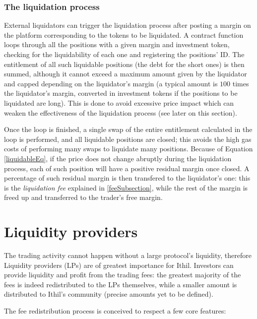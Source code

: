 \documentclass [10pt, fancyhdr, twoside] {article}
\begin{document}
\subsubsection{The liquidation process}\label{liquidationProcessSubsubsection}

External liquidators can trigger the liquidation process after posting a margin on the platform corresponding to the tokens to be liquidated. A contract function loops through all the positions with a given margin and investment token, checking for the liquidability of each one and registering the positions' ID. The entitlement of all such liquidable positions (the debt for the short ones) is then summed, although it cannot exceed a maximum amount given by the liquidator and capped depending on the liquidator's margin (a typical amount is $100$ times the liquidator's margin, converted in investment tokens if the positions to be liquidated are long). This is done to avoid excessive price impact which can weaken the effectiveness of the liquidation process (see later on this section).

Once the loop is finished, a single swap of the entire entitlement calculated in the loop is performed, and all liquidable positions are closed; this avoids the high gas costs of performing many swaps to liquidate many positions. Because of Equation \eqref{liquidableEq}, if the price does not change abruptly during the liquidation process, each of such position will have a positive residual margin once closed. A percentage of such residual margin is then transfered to the liquidator's one: this is the \textit{liquidation fee} explained in \ref{feeSubsection}, while the rest of the margin is freed up and transferred to the trader's free margin.

\section{Liquidity providers}\label{LPSection}

The trading activity cannot happen without a large protocol's liquidity, therefore Liquidity providers (LPs) are of greatest importance for Ithil. Investors can provide liquidity and profit from the trading fees: the greatest majority of the fees is indeed redistributed to the LPs themselves, while a smaller amount is distributed to Ithil's community (precise amounts yet to be defined).

The fee redistribution process is conceived to respect a few core features:
\end{document}
